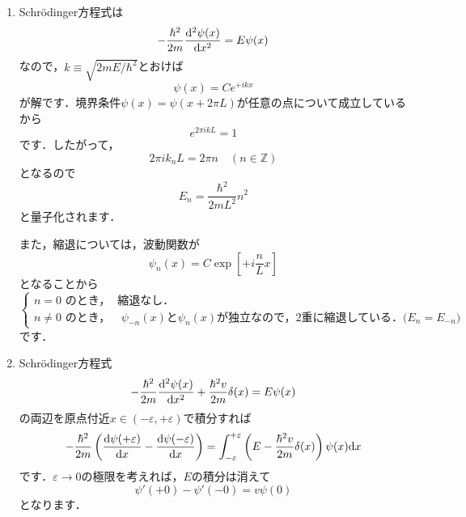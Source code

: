 \documentclass[a4paper,pdflatex,ja=standard]{bxjsarticle}
\begin{document}
\begin{enumerate}

  \item 

  Schrödinger方程式は
  \begin{equation}
    -\frac{\hbar^2}{2m}\dv[2]{\psi(x)}{x}
    =
    E\psi(x)
  \end{equation}
  なので，$k\equiv\sqrt{2mE/\hbar^2}$とおけば
  \begin{equation}
    \psi(x)
    =
    Ce^{+ikx}
  \end{equation}
  が解です．境界条件$\psi(x)=\psi(x+2\pi L)$が任意の点について成立しているから
  \begin{equation}
    e^{2\pi ikL}=1
  \end{equation}
  です．したがって，
  \begin{equation}
    2\pi ik_{n}L=2\pi n
    \quad
    (n\in\mathbb{Z})
  \end{equation}
  となるので
  \begin{equation}
    E_{n}
    =
    \frac{\hbar^2}{2mL^2}n^2
  \end{equation}
  と量子化されます．
  
  また，縮退については，波動関数が
  \begin{equation}
    \psi_{n}(x)
    =
    C\exp\left[ +i\frac{n}{L}x \right]
  \end{equation}
  となることから
  \begin{equation}
    \left\{
      \begin{alignedat}{1}
        n=0\text{\ のとき，}
        \ 
        &
        \ 
        \text{縮退なし．}
        \\
        n\neq0\text{\ のとき，}
        \ 
        &
        \ 
        \text{
          $\psi_{-n}(x)$と$\psi_{n}(x)$が独立なので，2重に縮退している．($E_{n}=E_{-n}$)
        }
      \end{alignedat}
    \right.
  \end{equation}
  です．


  \item 

  Schrödinger方程式
  \begin{equation}
    -\frac{\hbar^2}{2m}
    \dv[2]{\psi(x)}{x}
    +
    \frac{\hbar^2 v}{2m}\delta(x)
    =
    E\psi(x)
  \end{equation}
  の両辺を原点付近$x\in(-\varepsilon,+\varepsilon)$で積分すれば
  \begin{equation}
    -
    \frac{\hbar^2}{2m}
    \left(  
      \dv{\psi(+\varepsilon)}{x}
      -
      \dv{\psi(-\varepsilon)}{x}
    \right)
    =
    \int_{-\varepsilon}^{+\varepsilon}
    \left(  
      E-\frac{\hbar^2 v}{2m}\delta(x)
    \right)
    \psi(x)
    \dd x
  \end{equation}
  です．$\varepsilon\rightarrow0$の極限を考えれば，$E$の積分は消えて
  \begin{equation}
    \psi'(+0)
    -
    \psi'(-0)
    =
    v\psi(0)
  \end{equation}
  となります．


\end{enumerate}
\end{document}
